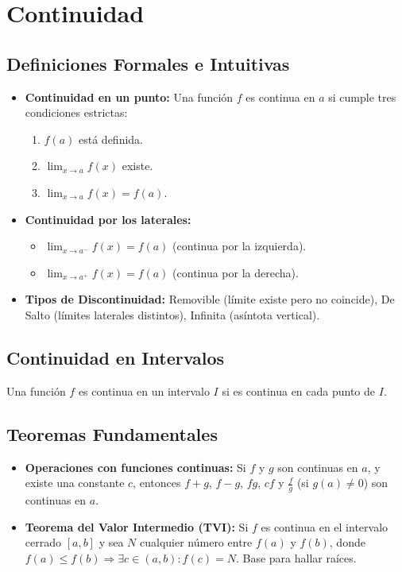 \documentclass[a4paper,12pt]{article}
\theoremstyle{definition}
\begin{document}
\newpage

\section{Continuidad}

\subsection{Definiciones Formales e Intuitivas}
\begin{itemize}
    \item \textbf{Continuidad en un punto:} Una función $f$ es continua en $a$ si cumple tres condiciones estrictas:
    \begin{enumerate}
        \item $f(a)$ está definida.
        \item $\lim_{x \to a} f(x)$ existe.
        \item $\lim_{x \to a} f(x) = f(a)$.
    \end{enumerate}
    \item \textbf{Continuidad por los laterales:}
        \begin{itemize}
            \item $\lim_{x \to a^-} f(x) = f(a)$ (continua por la izquierda).
            \item $\lim_{x \to a^+} f(x) = f(a)$ (continua por la derecha).
        \end{itemize}
    \item \textbf{Tipos de Discontinuidad:} Removible (límite existe pero no coincide), De Salto (límites laterales distintos), Infinita (asíntota vertical).
\end{itemize}

\subsection{Continuidad en Intervalos}
Una función $f$ es continua en un intervalo $I$ si es continua en cada punto de $I$.

\subsection{Teoremas Fundamentales}
\begin{itemize}
    \item \textbf{Operaciones con funciones continuas:} Si $f$ y $g$ son continuas en $a$, y existe una constante $c$, entonces $f+g$, $f-g$, $fg$, $cf$ y $\frac{f}{g}$ (si $g(a) \neq 0$) son continuas en $a$.
    \item \textbf{Teorema del Valor Intermedio (TVI):} Si $f$ es continua en el intervalo cerrado $[a, b]$ y sea $N$ cualquier número entre $f(a)$ y $f(b)$, donde $f(a) \leqslant f(b) \Rightarrow \exists c \in (a, b) : f(c) = N$. Base para hallar raíces.
\end{itemize}
\end{document}
